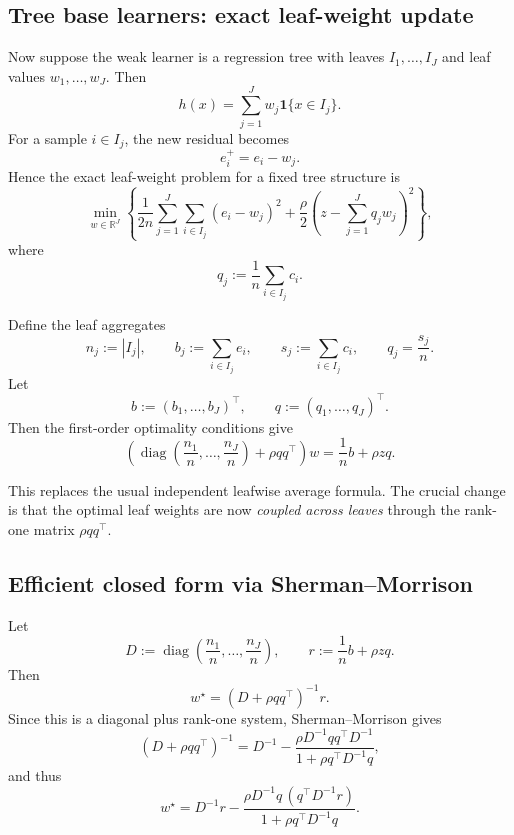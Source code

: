 \documentclass[11pt]{article}
\newcommand{\R}{\mathbb{R}}
\newcommand{\1}{\mathbf{1}}
\newcommand{\diag}{\operatorname{diag}}
\begin{document}
\subsection{Tree base learners: exact leaf-weight update}

Now suppose the weak learner is a regression tree with leaves $I_1,\dots,I_J$ and leaf values $w_1,\dots,w_J$. Then
\[
h(x) = \sum_{j=1}^J w_j \mathbf{1}\{x \in I_j\}.
\]
For a sample $i \in I_j$, the new residual becomes
\[
e_i^{+} = e_i - w_j.
\]
Hence the exact leaf-weight problem for a fixed tree structure is
\begin{equation}
\label{eq:leaf-problem-first-order}
\min_{w \in \R^J}
\left\{
\frac{1}{2n}\sum_{j=1}^J \sum_{i \in I_j} (e_i - w_j)^2
+
\frac{\rho}{2}
\left(
z - \sum_{j=1}^J q_j w_j
\right)^2
\right\},
\end{equation}
where
\[
q_j := \frac{1}{n}\sum_{i \in I_j} c_i.
\]

Define the leaf aggregates
\begin{equation}
\label{eq:leaf-aggregates-first-order}
n_j := |I_j|,
\qquad
b_j := \sum_{i \in I_j} e_i,
\qquad
s_j := \sum_{i \in I_j} c_i,
\qquad
q_j = \frac{s_j}{n}.
\end{equation}
Let
\[
b := (b_1,\dots,b_J)^\top,
\qquad
q := (q_1,\dots,q_J)^\top.
\]
Then the first-order optimality conditions give
\begin{equation}
\label{eq:coupled-leaf-system-first-order}
\left(
\diag\left(\frac{n_1}{n},\dots,\frac{n_J}{n}\right)
+
\rho q q^\top
\right) w
=
\frac{1}{n}b + \rho z q.
\end{equation}

This replaces the usual independent leafwise average formula. The crucial change is that the optimal leaf weights are now \emph{coupled across leaves} through the rank-one matrix $\rho qq^\top$.

\subsection{Efficient closed form via Sherman--Morrison}

Let
\[
D := \diag\left(\frac{n_1}{n},\dots,\frac{n_J}{n}\right),
\qquad
r := \frac{1}{n}b + \rho z q.
\]
Then
\[
w^\star = (D+\rho qq^\top)^{-1}r.
\]
Since this is a diagonal plus rank-one system, Sherman--Morrison gives
\begin{equation}
\label{eq:sherman-morrison-first-order}
(D+\rho qq^\top)^{-1}
=
D^{-1}
-
\frac{\rho D^{-1}qq^\top D^{-1}}
{1+\rho q^\top D^{-1}q},
\end{equation}
and thus
\begin{equation}
\label{eq:leaf-weights-first-order-closed-form}
w^\star
=
D^{-1}r
-
\frac{\rho D^{-1}q \, (q^\top D^{-1}r)}
{1+\rho q^\top D^{-1}q}.
\end{equation}
\end{document}
